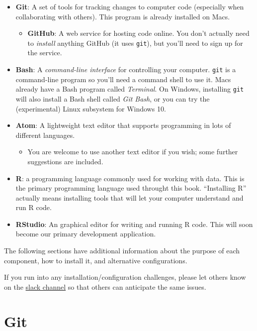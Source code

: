 \documentclass[]{book}
\providecommand{\tightlist}{%
  \setlength{\itemsep}{0pt}\setlength{\parskip}{0pt}}
\theoremstyle{definition}
\theoremstyle{definition}
\theoremstyle{remark}
\begin{document}
\begin{itemize}
\item
  \textbf{Git}: A set of tools for tracking changes to computer code
  (especially when collaborating with others). This program is already
  installed on Macs.

  \begin{itemize}
  \tightlist
  \item
    \textbf{GitHub}: A web service for hosting code online. You don't
    actually need to \emph{install} anything GitHub (it uses
    \texttt{git}), but you'll need to sign up for the service.
  \end{itemize}
\item
  \textbf{Bash}: A \emph{command-line interface} for controlling your
  computer. \texttt{git} is a command-line program so you'll need a
  command shell to use it. Macs already have a Bash program called
  \emph{Terminal}. On Windows, installing \texttt{git} will also install
  a Bash shell called \emph{Git Bash}, or you can try the (experimental)
  Linux subsystem for Windows 10.
\item
  \textbf{Atom}: A lightweight text editor that supports programming in
  lots of different languages.

  \begin{itemize}
  \tightlist
  \item
    You are welcome to use another text editor if you wish; some further
    suggestions are included.
  \end{itemize}
\item
  \textbf{R}: a programming language commonly used for working with
  data. This is the primary programming language used throught this
  book. ``Installing R'' actually means installing tools that will let
  your computer understand and run R code.
\item
  \textbf{RStudio}: An graphical editor for writing and running R code.
  This will soon become our primary development application.
\end{itemize}

The following sections have additional information about the purpose of
each component, how to install it, and alternative configurations.

If you run into any installation/configuration challenges, please let
others know on the \href{https://info201-a16.slack.com}{slack channel}
so that others can anticipate the same issues.

\section{Git}\label{git}
\end{document}
